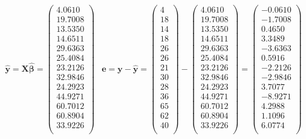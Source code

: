 $$\begin{array}{cc}
\hat{\textbf{y}} = \textbf{X}\hat{\boldsymbol{\beta}} = \left(\begin{array}{c}4.0610\\19.7008\\13.5350\\14.6511\\29.6363\\25.4084\\23.2126\\32.9846\\24.2923\\44.9271\\60.7012\\60.8904\\33.9226\\\end{array}\right) & 
\textbf{e}=\boldsymbol{y}-\hat{\boldsymbol{y}}= \left(\begin{array}{c} 4 \\18\\14\\18\\26\\26\\21\\30\\28\\36\\65\\62\\40\\\end{array}\right)-\left(\begin{array}{c}4.0610\\19.7008\\13.5350\\14.6511\\29.6363\\25.4084\\23.2126\\32.9846\\24.2923\\44.9271\\60.7012\\60.8904\\33.9226\\\end{array}\right)= \left(\begin{array}{c}-0.0610\\-1.7008\\0.4650\\3.3489\\-3.6363\\0.5916\\-2.2126\\-2.9846\\3.7077\\-8.9271\\4.2988\\1.1096\\6.0774\\\end{array}\right)
\end{array}
$$


